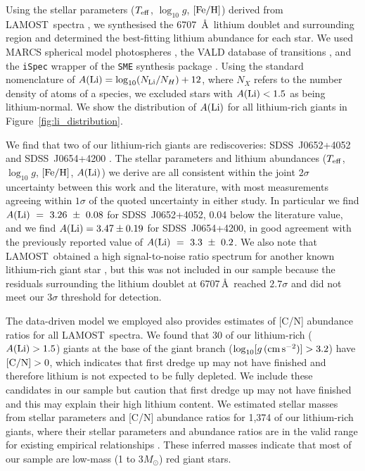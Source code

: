 \documentclass[twocolumn]{aastex62}
\newcommand\lamost{LAMOST}
\newcommand{\logg}{\log_{10}[g\,({\rm cm\,s}^{-2})]}
\begin{document}

Using the stellar parameters ($T_{\rm eff}$, $\log_{10}{g}$, $[{\rm Fe/H}]$)
derived from \lamost\ spectra \citep{Ho_2017a}, we synthesised the 6707~\AA\ lithium 
doublet and surrounding region and determined the best-fitting lithium abundance for 
each star. We used MARCS spherical model photospheres \citep{Gustafsson_2008}, the
VALD database of transitions \citep{Piskunov_1995}, and the \texttt{iSpec} 
\citep{Blanco_Cuaresma_2014} wrapper of the \texttt{SME} synthesis package \citep{Valenti_1996}.
Using the standard nomenclature of 
$A({\rm Li}) = \log_{10}(N_{\rm Li}/N_{H}) + 12$, where $N_X$ refers to the
number density of atoms of a species, we excluded stars with $A({\rm Li}) < 1.5$
as being lithium-normal. We show the distribution of $A({\rm Li})$ for all 
lithium-rich giants in Figure~\ref{fig:li_distribution}.

We find that two of our lithium-rich giants are rediscoveries:
SDSS~J0652+4052 and SDSS~J0654+4200 \citep{Martell_2013}. The stellar parameters and lithium 
abundances ($T_{\rm eff}$, $\log_{10}g$, $[{\rm Fe/H}]$, $A({\rm Li})$) we 
derive are all consistent within the joint $2\sigma$ uncertainty between this
work and the literature, with most measurements agreeing within $1\sigma$ of 
the quoted uncertainty in either study. In particular we find 
$A({\rm Li})~=~3.26~\pm~0.08$ for SDSS~J0652+4052, 0.04 below 
the literature value, and we find $A({\rm Li}) = 3.47 \pm 0.19$ for 
SDSS~J0654+4200, in good agreement with the previously reported 
value of $A({\rm Li})~=~3.3~\pm~0.2$. We also note that \lamost\ obtained a high signal-to-noise
ratio spectrum for another known lithium-rich giant star \citep[SDSS~J0304+3823;][]{Martell_2013}, 
but this was not included in our sample because the residuals surrounding the
lithium doublet at 6707\,\AA\ reached $2.7\sigma$ and did not meet our $3\sigma$
threshold for detection.


The data-driven model we employed also provides estimates of [C/N] abundance
ratios for all \lamost\ spectra. We found that 30 of our lithium-rich 
($A({\rm Li}) > 1.5$) giants at the base of the giant branch 
($\logg > 3.2$) have $[{\rm C/N}] > 0$, which indicates that first dredge up may not have finished and therefore lithium is not expected to be fully depleted.
We include these candidates in our sample but caution that first 
dredge up may not have finished and this may explain their high
lithium content. We estimated stellar masses from stellar parameters and 
[C/N] abundance ratios for 1,374 of our lithium-rich giants, where their 
stellar parameters and abundance ratios are in the valid range for existing 
empirical relationships \citep{Martig_2016}. These inferred masses indicate 
that most of our sample are low-mass (1 to 3$M_\odot$) red giant stars.
\end{document}
